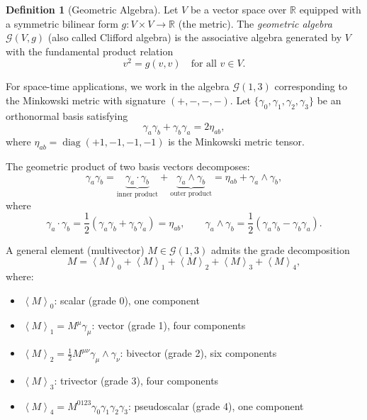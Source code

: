 \documentclass[11pt,a4paper]{article}
\numberwithin{equation}{section}
\theoremstyle{plain}
\theoremstyle{definition}
\newtheorem{definition}[theorem]{Definition}
\theoremstyle{remark}
\newcommand{\R}{\mathbb{R}}
\newcommand{\Cl}{\mathcal{G}}               %
\newcommand{\grade}[2]{\left\langle #1 \right\rangle_{#2}}
\newcommand{\scal}[1]{\grade{#1}{0}}       %
\newcommand{\vecp}[1]{\grade{#1}{1}}       %
\newcommand{\biv}[1]{\grade{#1}{2}}        %
\newcommand{\triv}[1]{\grade{#1}{3}}       %
\DeclareMathOperator{\diag}{diag}
\begin{document}
\begin{definition}[Geometric Algebra]
Let $V$ be a vector space over $\R$ equipped with a symmetric bilinear form $g: V \times V \to \R$ (the metric). The \emph{geometric algebra} $\Cl(V,g)$ (also called Clifford algebra) is the associative algebra generated by $V$ with the fundamental product relation
\begin{equation}
v^2 = g(v,v) \quad \text{for all } v \in V.
\label{eq:fundamental-relation}
\end{equation}
\end{definition}

For space-time applications, we work in the algebra $\Cl(1,3)$ corresponding to the Minkowski metric with signature $(+,-,-,-)$. Let $\{\gamma_0, \gamma_1, \gamma_2, \gamma_3\}$ be an orthonormal basis satisfying
\begin{equation}
\gamma_a \gamma_b + \gamma_b \gamma_a = 2\eta_{ab},
\label{eq:basis-anticommutation}
\end{equation}
where $\eta_{ab} = \diag(+1,-1,-1,-1)$ is the Minkowski metric tensor.

The geometric product of two basis vectors decomposes:
\begin{equation}
\gamma_a \gamma_b = \underbrace{\gamma_a \cdot \gamma_b}_{\text{inner product}} + \underbrace{\gamma_a \wedge \gamma_b}_{\text{outer product}} = \eta_{ab} + \gamma_a \wedge \gamma_b,
\label{eq:product-decomposition}
\end{equation}
where
\begin{equation}
\gamma_a \cdot \gamma_b = \frac{1}{2}(\gamma_a\gamma_b + \gamma_b\gamma_a) = \eta_{ab},
\qquad
\gamma_a \wedge \gamma_b = \frac{1}{2}(\gamma_a\gamma_b - \gamma_b\gamma_a).
\end{equation}

A general element (multivector) $M \in \Cl(1,3)$ admits the grade decomposition
\begin{equation}
M = \scal{M} + \vecp{M} + \biv{M} + \triv{M} + \grade{M}{4},
\end{equation}
where:
\begin{itemize}
\item $\scal{M}$: scalar (grade 0), one component
\item $\vecp{M} = M^\mu \gamma_\mu$: vector (grade 1), four components
\item $\biv{M} = \frac{1}{2}M^{\mu\nu}\gamma_\mu \wedge \gamma_\nu$: bivector (grade 2), six components
\item $\triv{M}$: trivector (grade 3), four components
\item $\grade{M}{4} = M^{0123}\gamma_0\gamma_1\gamma_2\gamma_3$: pseudoscalar (grade 4), one component
\end{itemize}
\end{document}
